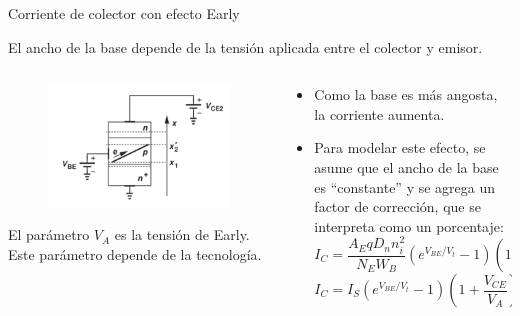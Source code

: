 \documentclass[t,aspectratio=169]{beamer}
\begin{document}
\begin{frame}{Corriente de colector con efecto Early}

El ancho de la base depende de la tensión aplicada entre el colector y emisor.


\begin{columns}
\begin{column}{0.4\textwidth}

\begin{figure}[H]
    \centering
    \includegraphics[width=\textwidth]{figuras/efecto_early_sentido_fisico_2.png}
\end{figure}

El parámetro $V_A$ es la tensión de Early. Este parámetro depende de la tecnología.

\end{column}
\begin{column}{0.6\textwidth}

\begin{itemize}
    \item Como la base es más angosta, la corriente aumenta.
    \item Para modelar este efecto, se asume que el ancho de la base es ``constante'' y se agrega un factor de corrección, que se interpreta como un porcentaje:
    \[ I_C = \dfrac{A_E q D_n n_i^2 }{N_E W_B} \left( e^{V_{BE}/V_t} - 1 \right) \left( 1 + \dfrac{V_{CE}}{V_A} \right) \]
    \[ I_C = I_S \left( e^{V_{BE}/V_t} - 1 \right) \left( 1 + \dfrac{V_{CE}}{V_A} \right) \]
\end{itemize}

\end{column}
\end{columns}

\end{frame}
\end{document}
